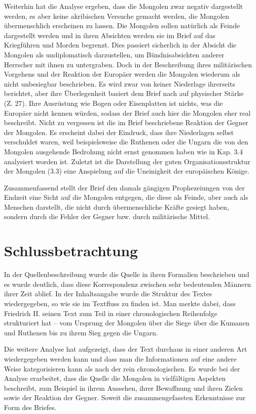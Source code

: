 \documentclass[12pt,headsepline,a4paper]{scrartcl}
\begin{document}
Weiterhin hat die Analyse ergeben, dass die Mongolen zwar negativ dargestellt
werden, es aber keine akribischen Versuche gemacht werden, die Mongolen übermenschlich
erscheinen zu lassen. Die Mongolen sollen natürlich als Feinde dargestellt werden und
in ihren Absichten werden sie im Brief auf das Kriegführen und Morden begrenzt. Dies
passiert sicherlich in der Absicht die Mongolen als undiplomatisch darzustellen, um
Bündnisabsichten anderer Herrscher mit ihnen zu untergraben. Doch in der
Beschreibung ihres militärischen Vorgehens und der Reaktion der Europäer werden die
Mongolen wiederum als nicht unbesiegbar beschrieben. Es wird zwar von keiner
Niederlage ihrerseits berichtet, aber ihre Überlegenheit basiert dem Brief nach auf
physischer Stärke (Z. 27). Ihre Ausrüstung wie Bogen oder Eisenplatten ist nichts, was
die Europäer nicht kennen würden, sodass der Brief auch hier die Mongolen eher real
beschreibt. Nicht zu vergessen ist die im Brief beschriebene Reaktion der Gegner der
Mongolen. Es erscheint dabei der Eindruck, dass ihre Niederlagen selbst verschuldet
waren, weil beispielsweise die Ruthenen oder die Ungarn die von den Mongolen
ausgehende Bedrohung nicht ernst genommen haben wie in Kap. 3.4 analysiert worden ist.
Zuletzt ist die Darstellung der guten Organisationsstruktur der Mongolen (3.3) eine
Anspielung auf die Uneinigkeit der europäischen Könige.

Zusammenfassend stellt der Brief den damals gängigen Prophezeiungen von der
Endzeit eine Sicht auf die Mongolen entgegen, die diese als Feinde, aber auch als
Menschen darstellt, die nicht durch übermenschliche Kräfte gesiegt haben, sondern
durch die Fehler der Gegner bzw. durch militärische Mittel.
\newpage
\section*{Schlussbetrachtung}

In der
Quellenbeschreibung wurde die Quelle in ihren Formalien beschrieben und es wurde
deutlich, dass diese Korrespondenz zwischen sehr bedeutenden Männern ihrer Zeit
ablief. In der Inhaltsangabe wurde die Struktur des Textes wiedergegeben, so wie sie im
Textfluss zu finden ist. Man merkte dabei, dass Friedrich II. seinen Text zum Teil in
einer chronologischen Reihenfolge strukturiert hat – vom Ursprung der Mongolen über
die Siege über die Kumanen und Ruthenen bis zu ihrem Sieg gegen die Ungarn.

Die weitere Analyse hat aufgezeigt, dass der Text durchaus in einer anderen Art
wiedergegeben werden kann und dass man die Informationen auf eine andere Weise
kategorisieren kann als nach der rein chronologischen. Es wurde bei der Analyse erarbeitet,
dass die Quelle die Mongolen in vielfältigen Aspekten beschreibt, zum Beispiel in
ihrem Aussehen, ihrer Bewaffnung und ihren Zielen sowie der Reaktion der Gegner.
Soweit die zusammengefassten Erkenntnisse zur Form des Briefes.
\end{document}
